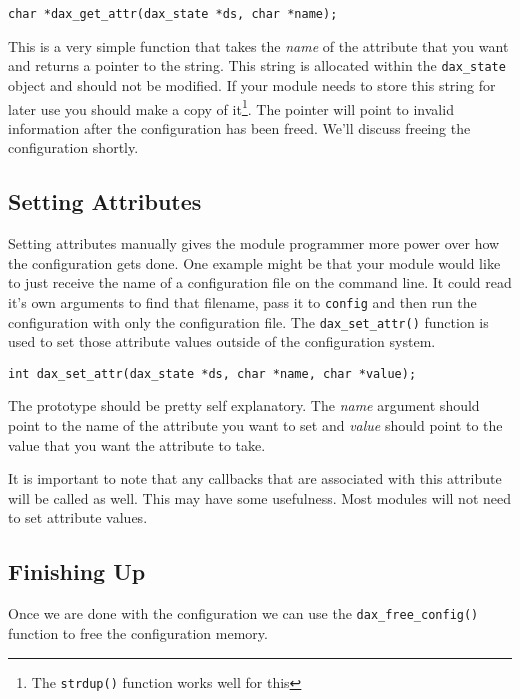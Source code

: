 \begin{verbatim}
char *dax_get_attr(dax_state *ds, char *name);
\end{verbatim}

This is a very simple function that takes the \textit{name} of the attribute
that you want and returns a pointer to the string.  This string is allocated
within the \verb|dax_state| object and should not be modified.  If your module
needs to store this string for later use you should make a copy of
it\footnote{The \texttt{strdup()} function works well for this}.  The pointer
will point to invalid information after the configuration has been freed.  We'll
discuss freeing the configuration shortly.

\subsection{Setting Attributes}

Setting attributes manually gives the module programmer more power over how
the configuration gets done.  One example might be that your module would
like to just receive the name of a configuration file on the command line.
It could read it's own arguments to find that filename, pass it to \verb|config|
and then run the configuration with only the configuration file.
The \verb|dax_set_attr()| function is used 
to set those attribute values outside of the configuration system.

\begin{verbatim}
int dax_set_attr(dax_state *ds, char *name, char *value);
\end{verbatim}

The prototype should be pretty self explanatory.  The \textit{name} argument
should point to the name of the attribute you want to set and \textit{value}
should point to the value that you want the attribute to take.

It is important to note that any callbacks that are associated with this
attribute will be called as well.  This may have some usefulness.  Most modules
will not need to set attribute values.

\subsection{Finishing Up}

Once we are done with the configuration we can use the
\verb|dax_free_config()| function to free
the configuration memory.

